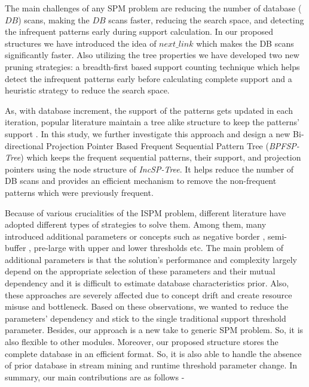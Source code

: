 The main challenges of any SPM problem are reducing the number of database ($DB$) scans, making the $DB$ scans faster, reducing the search space, and detecting the infrequent patterns early during support calculation. In our proposed structures we have introduced the idea of $next\_link$ which makes the DB scans significantly faster. Also utilizing the tree properties we have developed two new pruning strategies: a breadth-first based support counting technique which helps detect the infrequent patterns early before calculating complete support and a heuristic strategy to reduce the search space. 

As, with database increment, the support of the patterns gets updated in each iteration, popular literature maintain a tree alike structure to keep the patterns' support \cite{chen2007incremental,liu2012incremental,lin2015incrementally}. In this study, we further investigate this approach and design a new Bi-directional Projection Pointer Based Frequent Sequential Pattern Tree (\textit{BPFSP-Tree}) which keeps the frequent sequential patterns, their support, and projection pointers using the node structure of \textit{IncSP-Tree}. It helps reduce the number of DB scans and provides an efficient mechanism to remove the non-frequent patterns which were previously frequent.


Because of various crucialities of the ISPM problem, different literature have adopted different types of strategies to solve them. Among them, many introduced additional parameters or concepts such as negative border \cite{zheng2002algorithms}, semi-buffer \cite{cheng2004incspan}, pre-large with upper and lower thresholds \cite{lin2015incrementally} etc. The main problem of additional parameters is that the solution's performance and complexity largely depend on the appropriate selection of these parameters and their mutual dependency and it is difficult to estimate database characteristics prior. Also, these approaches are severely affected due to concept drift and create resource misuse and bottleneck.  Based on these observations, we wanted to reduce the parameters' dependency and stick to the single traditional support threshold parameter. Besides, our approach is a new take to generic SPM problem. So, it is also flexible to other modules. Moreover, our proposed structure stores the complete database in an efficient format. So, it is also able to handle the absence of prior database in stream mining and runtime threshold parameter change. In summary, our main contributions are as follows -

